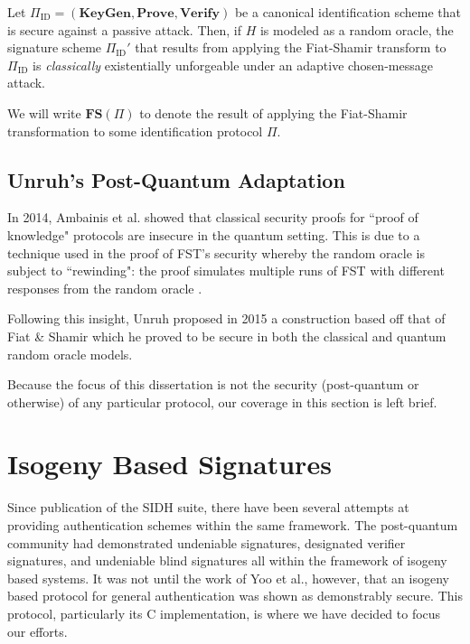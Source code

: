 \begin{tcolorbox}
\begin{theorem}
\label{thm:fiatshamir}
Let $\Pi_{\text{ID}} = (\textbf{KeyGen}, \textbf{Prove}, \textbf{Verify})$ be a canonical identification scheme that is secure against a passive attack. Then, if $H$ is modeled as a random oracle, the signature scheme $\Pi_{\text{ID}}'$ that results from applying the Fiat-Shamir transform to $\Pi_{\text{ID}}$ is \emph{classically} existentially unforgeable under an adaptive chosen-message attack.
\end{theorem}
\end{tcolorbox}

We will write $\textbf{FS}(\Pi)$ to denote the result of applying the Fiat-Shamir transformation to some identification protocol $\Pi$.

\subsection{Unruh's Post-Quantum Adaptation}

In 2014, Ambainis et al. showed that classical security proofs for ``proof of knowledge" protocols are insecure in the quantum setting. This is due to a technique used in the proof of FST's security whereby the random oracle is subject to ``rewinding": the proof simulates multiple runs of FST with different responses from the random oracle \cite{rewinding}.

Following this insight, Unruh proposed in 2015 a construction based off that of Fiat \& Shamir which he proved to be secure in both the classical and quantum random oracle models.

Because the focus of this dissertation is not the security (post-quantum or otherwise) of any particular protocol, our coverage in this section is left brief. 

\section{Isogeny Based Signatures}

Since publication of the SIDH suite, there have been several attempts at providing authentication schemes within the same framework. The post-quantum community had demonstrated undeniable signatures\cite{jvsig}, designated verifier signatures\cite{sunsig}, and undeniable blind signatures\cite{seshsig} all within the framework of isogeny based systems. It was not until the work of Yoo et al., however, that an isogeny based protocol for general authentication was shown as demonstrably secure. This protocol, particularly its C implementation, is where we have decided to focus our efforts.

